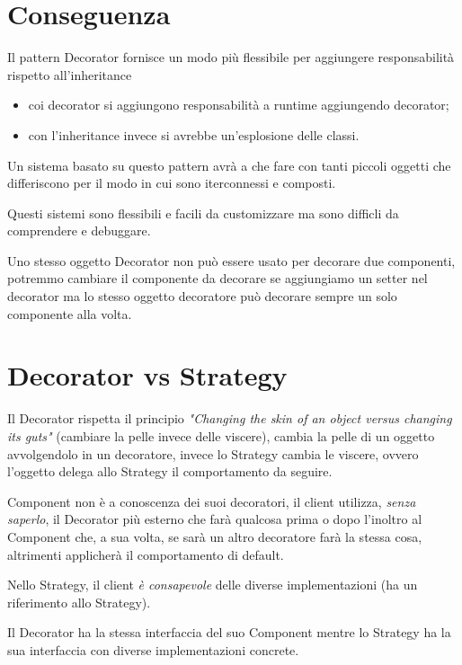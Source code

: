 \section{Conseguenza}

Il pattern Decorator fornisce un modo più flessibile per aggiungere responsabilità rispetto all’inheritance
\begin{itemize}
    \item coi decorator si aggiungono responsabilità a runtime aggiungendo decorator;
    \item con l’inheritance invece si avrebbe un’esplosione delle classi.
\end{itemize}

Un sistema basato su questo pattern avrà a che fare con tanti piccoli oggetti che differiscono per il modo in cui sono iterconnessi e composti.

Questi sistemi sono flessibili e facili da customizzare ma sono difficli da comprendere e debuggare.

Uno stesso oggetto Decorator non può essere usato per decorare due componenti, potremmo cambiare il componente da decorare se aggiungiamo un setter nel decorator ma 
lo stesso oggetto decoratore può decorare sempre un solo componente alla volta.

\section{Decorator vs Strategy}

Il Decorator rispetta il principio \textit{"Changing the skin of an object versus changing its guts"} (cambiare la pelle invece delle viscere), cambia la pelle di un 
oggetto avvolgendolo in un decoratore, invece lo Strategy cambia le viscere, ovvero l'oggetto delega allo Strategy il comportamento da seguire.
\smallskip

Component non è a conoscenza dei suoi decoratori, il client utilizza, \textit{senza saperlo}, il Decorator più esterno che farà qualcosa prima o dopo l'inoltro al 
Component che, a sua volta, se sarà un altro decoratore farà la stessa cosa, altrimenti applicherà il comportamento di default.

Nello Strategy, il client \textit{è consapevole} delle diverse implementazioni (ha un riferimento allo Strategy).
\smallskip

Il Decorator ha la stessa interfaccia del suo Component mentre lo Strategy ha la sua interfaccia con diverse implementazioni concrete.

